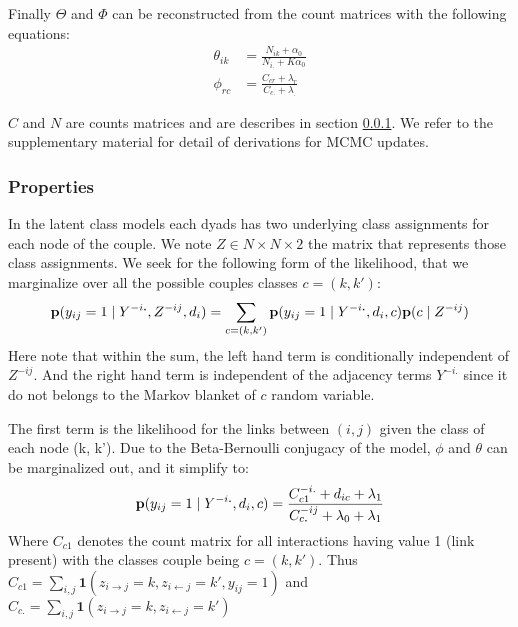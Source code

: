 Finally $\Theta$ and $\Phi$ can be reconstructed from the count matrices with the following equations:
\begin{align}
\theta_{ik} &= \frac{N_{ik} + \alpha_0}{ N_{i\bm{.}} + K\alpha_0} \\
\phi_{rc} &= \frac{C_{cr} + \lambda_r}{ C_{c.} + \lambda_{\bm{.}}}
\end{align}

$C$ and $N$ are counts matrices and are describes in section \ref{burst_class}. We refer to the supplementary material for detail of derivations for MCMC updates. 

\subsubsection{Properties}

\label{burst_class}

In the latent class models each  dyads has two underlying  class assignments for each node of the couple. We note $Z \in N\times N\times 2$ the matrix that represents those class assignments.
We seek for the following form of the likelihood, that we marginalize over all the possible couples classes $c=(k, k')$:
\begin{equation} \label{eq:q}
\pr(y_{ij}=1 \mid Y^{-i\bm{.}}, Z^{-ij}, d_i ) = \sum_{c=(k, k')} \pr(y_{ij}=1 \mid Y^{-i\bm{.}}, d_i , c) \pr(c \mid  Z^{-ij} ) 
\end{equation}
Here note that within the sum, the left hand term is conditionally independent of $Z^{-ij}$. And the right hand term is independent of the adjacency terms $Y^{-i\bm{.}}$ since it do not belongs to the Markov blanket of $c$ random variable.

The first term is the likelihood for the links between $(i,j)$ given the class of each node (k, k'). Due to the Beta-Bernoulli conjugacy of the model, $\phi$ and $\theta$ can be marginalized out, and it simplify to: 
\begin{equation} \label{eq:qc}
\pr(y_{ij}=1 \mid Y^{-i\bm{.}}, d_i , c) = \frac{C_{c1}^{-i.} + d_{ic} + \lambda_1}{C_{c\bm{.}}^{-ij} + \lambda_0+\lambda_1} 
\end{equation}
Where $C_{c1}$ denotes the count matrix for all interactions having value 1 (link present) with the classes couple being $c=(k, k')$. Thus $C_{c1} = \sum_{i,j} \bm{1}(z_{i\rightarrow j}=k, z_{i\leftarrow j}=k', y_{ij}=1)$ and $C_{c.} = \sum_{i,j} \bm{1}(z_{i\rightarrow j}=k, z_{i\leftarrow j}=k')$\\

